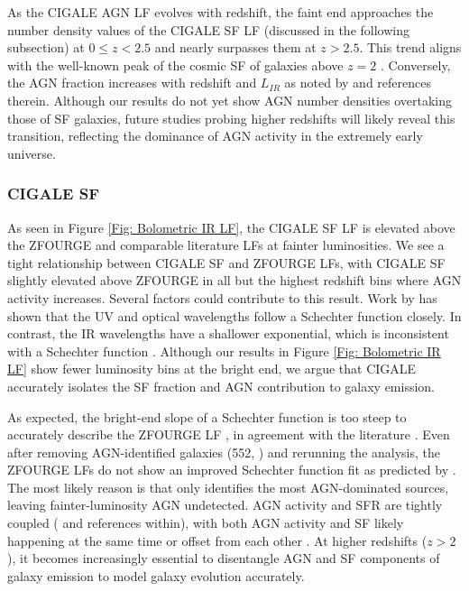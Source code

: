 As the CIGALE AGN LF evolves with redshift, the faint end approaches the number density values of the CIGALE SF LF (discussed in the following subsection) at $0 \leq z < 2.5$ and nearly surpasses them at $z > 2.5$. This trend aligns with the well-known peak of the cosmic SF of galaxies above $z=2$ \citep{madau_cosmic_2014}. Conversely, the AGN fraction increases with redshift and $L_{IR}$ as noted by \cite{symeonidis_agn_2021, thorne_deep_2022} and references therein. Although our results do not yet show AGN number densities overtaking those of SF galaxies, future studies probing higher redshifts will likely reveal this transition, reflecting the dominance of AGN activity in the extremely early universe.

\subsubsection{CIGALE SF}
As seen in Figure \ref{Fig: Bolometric IR LF}, the CIGALE SF LF is elevated above the ZFOURGE and comparable literature LFs at fainter luminosities. We see a tight relationship between CIGALE SF and ZFOURGE LFs, with CIGALE SF slightly elevated above ZFOURGE in all but the highest redshift bins where AGN activity increases. Several factors could contribute to this result. Work by \cite{wu_mid-infrared_2011} has shown that the UV and optical wavelengths follow a Schechter function closely. In contrast, the IR wavelengths have a shallower exponential, which is inconsistent with a Schechter function \citep{symeonidis_what_2019}. Although our results in Figure \ref{Fig: Bolometric IR LF} show fewer luminosity bins at the bright end, we argue that CIGALE accurately isolates the SF fraction and AGN contribution to galaxy emission. 

As expected, the bright-end slope of a Schechter function is too steep to accurately describe the ZFOURGE LF \citep{wu_mid-infrared_2011}, in agreement with the literature \citep{rodighiero_mid-_2010, gruppioni_herschel_2013, symeonidis_what_2019}. Even after removing AGN-identified galaxies (552, \citealp{cowley_zfourge_2016}) and rerunning the analysis, the ZFOURGE LFs do not show an improved Schechter function fit as predicted by \cite{fu_decomposing_2010, wu_mid-infrared_2011}. The most likely reason is that \cite{cowley_zfourge_2016} only identifies the most AGN-dominated sources, leaving fainter-luminosity AGN undetected. AGN activity and SFR are tightly coupled (\citealp{alexander_what_2012} and references within), with both AGN activity and SF likely happening at the same time or offset from each other \citep{cowley_decoupled_2018}. At higher redshifts ($z > 2$), it becomes increasingly essential to disentangle AGN and SF components of galaxy emission to model galaxy evolution accurately.

